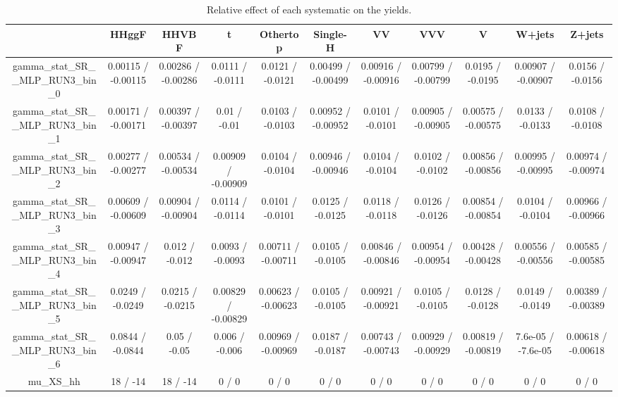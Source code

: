 \documentclass[10pt]{article}
\begin{document}
\begin{table}[htbp]
\begin{center}
\begin{tabular}{|c|c|c|c|c|c|c|c|c|c|c|}
\hline 
      & HHggF      & HHVBF      & t      & Othertop      & Single-H      & VV      & VVV      & V      & W+jets      & Z+jets \\ 
\hline 
  gamma_stat_SR__MLP_RUN3_bin_0 & 0.00115 / -0.00115 & 0.00286 / -0.00286 & 0.0111 / -0.0111 & 0.0121 / -0.0121 & 0.00499 / -0.00499 & 0.00916 / -0.00916 & 0.00799 / -0.00799 & 0.0195 / -0.0195 & 0.00907 / -0.00907 & 0.0156 / -0.0156 \\ 
  gamma_stat_SR__MLP_RUN3_bin_1 & 0.00171 / -0.00171 & 0.00397 / -0.00397 & 0.01 / -0.01 & 0.0103 / -0.0103 & 0.00952 / -0.00952 & 0.0101 / -0.0101 & 0.00905 / -0.00905 & 0.00575 / -0.00575 & 0.0133 / -0.0133 & 0.0108 / -0.0108 \\ 
  gamma_stat_SR__MLP_RUN3_bin_2 & 0.00277 / -0.00277 & 0.00534 / -0.00534 & 0.00909 / -0.00909 & 0.0104 / -0.0104 & 0.00946 / -0.00946 & 0.0104 / -0.0104 & 0.0102 / -0.0102 & 0.00856 / -0.00856 & 0.00995 / -0.00995 & 0.00974 / -0.00974 \\ 
  gamma_stat_SR__MLP_RUN3_bin_3 & 0.00609 / -0.00609 & 0.00904 / -0.00904 & 0.0114 / -0.0114 & 0.0101 / -0.0101 & 0.0125 / -0.0125 & 0.0118 / -0.0118 & 0.0126 / -0.0126 & 0.00854 / -0.00854 & 0.0104 / -0.0104 & 0.00966 / -0.00966 \\ 
  gamma_stat_SR__MLP_RUN3_bin_4 & 0.00947 / -0.00947 & 0.012 / -0.012 & 0.0093 / -0.0093 & 0.00711 / -0.00711 & 0.0105 / -0.0105 & 0.00846 / -0.00846 & 0.00954 / -0.00954 & 0.00428 / -0.00428 & 0.00556 / -0.00556 & 0.00585 / -0.00585 \\ 
  gamma_stat_SR__MLP_RUN3_bin_5 & 0.0249 / -0.0249 & 0.0215 / -0.0215 & 0.00829 / -0.00829 & 0.00623 / -0.00623 & 0.0105 / -0.0105 & 0.00921 / -0.00921 & 0.0105 / -0.0105 & 0.0128 / -0.0128 & 0.0149 / -0.0149 & 0.00389 / -0.00389 \\ 
  gamma_stat_SR__MLP_RUN3_bin_6 & 0.0844 / -0.0844 & 0.05 / -0.05 & 0.006 / -0.006 & 0.00969 / -0.00969 & 0.0187 / -0.0187 & 0.00743 / -0.00743 & 0.00929 / -0.00929 & 0.00819 / -0.00819 & 7.6e-05 / -7.6e-05 & 0.00618 / -0.00618 \\ 
  mu_XS_hh & 18 / -14 & 18 / -14 & 0 / 0 & 0 / 0 & 0 / 0 & 0 / 0 & 0 / 0 & 0 / 0 & 0 / 0 & 0 / 0 \\ 
\hline 
\end{tabular} 
\caption{Relative effect of each systematic on the yields.} 
\end{center} 
\end{table} 
\end{document}
